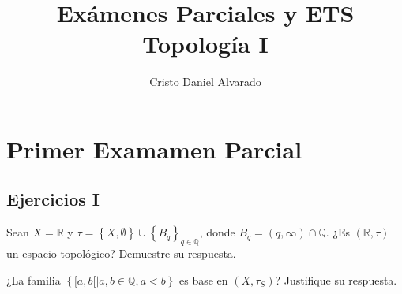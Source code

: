 \documentclass[12pt]{report}
\theoremstyle{largebreak}
\begin{document}
    \setlength{\parskip}{5pt} %
    \setlength{\parindent}{12pt} %
    \title{Exámenes Parciales y ETS Topología I}
    \author{Cristo Daniel Alvarado}
    \maketitle

    \tableofcontents %


    \chapter{Primer Examamen Parcial}

    \section{Ejercicios I}

    \begin{excer}
        Sean $X=\mathbb{R}$ y $\tau=\left\{X,\emptyset \right\}\cup\left\{B_q\right\}_{q\in\mathbb{Q}}$, donde $B_q=(q,\infty)\cap\mathbb{Q}$. ¿Es $(\mathbb{R},\tau)$ un espacio topológico? Demuestre su respuesta.
    \end{excer}

    \begin{sol}
        
    \end{sol}

    \begin{excer}
        ¿La familia $\left\{[a,b[\big| a,b\in\mathbb{Q}, a<b \right\}$ es base en $(X,\tau_S)$? Justifique su respuesta.
    \end{excer}

    \begin{sol}
        
    \end{sol}
\end{document}
